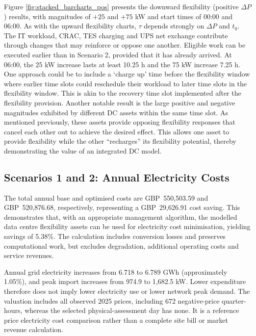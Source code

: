 \documentclass[lettersize,journal]{IEEEtran}
\providecommand{\DIFadd}[1]{{\color{blue}#1}}
\providecommand{\DIFaddbegin}{}
\providecommand{\DIFaddend}{}
\begin{document}
\DIFaddend 

Figure \ref{fig:stacked_barcharts_pos}  \DIFaddbegin \DIFadd{presents }\DIFaddend the downward flexibility  \DIFaddbegin \DIFadd{(positive $\Delta P$) results, with magnitudes of $+25$ and $+75$ kW and start times of 00:00 and 06:00. }\DIFaddend As  with the upward flexibility charts, $\tau$ depends strongly on  $\Delta P$ and $t_0$. The \DIFaddbegin \DIFadd{IT workload, }\DIFaddend CRAC, TES  \DIFaddbegin \DIFadd{charging and UPS net exchange contribute through changes that may reinforce or oppose one another. Eligible work can be executed earlier than in Scenario 2, provided that it has already arrived. At 06:00, the 25 kW increase lasts at least 10.25 h and the 75 kW increase 7.25 h}\DIFaddend . One approach could be to include a `charge up' time before the flexibility window where earlier time slots could reschedule their workload to later time slots in the flexibility window. This is akin to the recovery time slot implemented after the flexibility provision. Another notable result is the large positive and negative magnitudes exhibited by different DC assets within the same  \DIFaddbegin \DIFadd{time slot}\DIFaddend . As mentioned previously, these assets provide opposing flexibility responses that cancel each other out to achieve the desired effect. This allows one asset to provide flexibility while the other ``recharges'' its flexibility potential, thereby demonstrating the value of an integrated DC model.

\DIFaddbegin \subsection{\DIFadd{Scenarios 1 and 2: Annual Electricity Costs}}
\DIFadd{The total annual base and optimised costs are GBP~550,503.59 and GBP~520,876.68, respectively, representing a GBP~29,626.91 cost saving. This demonstrates that, with an appropriate management algorithm, the modelled data centre flexibility assets can be used for electricity cost minimisation, yielding savings of 5.38\%. The calculation includes conversion losses and preserves computational work, but excludes degradation, additional operating costs and service revenues.

}

\DIFadd{Annual grid electricity increases from 6.718 to 6.789 GWh (approximately 1.05\%), and peak import increases from 974.9 to 1,682.5 kW. Lower expenditure therefore does not imply lower electricity use or lower network peak demand. The valuation includes all observed 2025 prices, including 672 negative-price quarter-hours, whereas the selected physical-assessment day has none. It is a reference price electricity cost comparison rather than a complete site bill or market revenue calculation.

}
\end{document}
